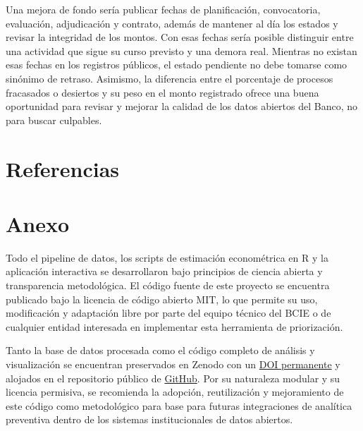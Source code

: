 \documentclass[11pt,letterpaper]{article}
\begin{document}
	\medspace
	
	Una mejora de fondo sería publicar fechas de planificación, convocatoria, evaluación, adjudicación y contrato, además de mantener al día los estados y revisar la integridad de los montos. Con esas fechas sería posible distinguir entre una actividad que sigue su curso previsto y una demora real. Mientras no existan esas fechas en los registros públicos, el estado pendiente no debe tomarse como sinónimo de retraso. Asimismo, la diferencia entre el porcentaje de procesos fracasados o desiertos y su peso en el monto registrado ofrece una buena oportunidad para revisar y mejorar la calidad de los datos abiertos del Banco, no para buscar culpables.
	
	\section*{Referencias}
	\label{sec:referencias}
	
	\printbibliography[heading=none]
	
	\newpage
	\appendix
	\section{Anexo}
	\label{sec:anexo}
	
	Todo el pipeline de datos, los scripts de estimación econométrica en R y la aplicación interactiva se desarrollaron bajo principios de ciencia abierta y transparencia metodológica. El código fuente de este proyecto se encuentra publicado bajo la licencia de código abierto MIT, lo que permite su uso, modificación y adaptación libre por parte del equipo técnico del BCIE o de cualquier entidad interesada en implementar esta herramienta de priorización.
	
	\medspace
	
	Tanto la base de datos procesada como el código completo de análisis y visualización se encuentran preservados en Zenodo con un \href{https://doi.org/10.5281/zenodo.24484873}{DOI permanente} y alojados en el repositorio público de \href{https://github.com/Emerson-nic/Second_Datathon_BCIE}{GitHub}. Por su naturaleza modular y su licencia permisiva, se recomienda la adopción, reutilización y mejoramiento de este código como metodológico para base para futuras integraciones de analítica preventiva dentro de los sistemas institucionales de datos abiertos.
	
	\medspace
	
	
	
	
\end{document}
